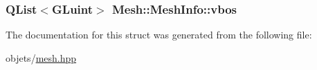 \hypertarget{struct_mesh_1_1_mesh_info_ad360b326ff7424dc9b6a3f6614af895d}{
\subsubsection[{vbos}]{\setlength{\rightskip}{0pt plus 5cm}Q\+List$<$G\+Luint$>$ Mesh\+::\+Mesh\+Info\+::vbos}}\label{struct_mesh_1_1_mesh_info_ad360b326ff7424dc9b6a3f6614af895d}


The documentation for this struct was generated from the following file\+:\begin{DoxyCompactItemize}
\item 
objets/\hyperlink{mesh_8hpp}{mesh.\+hpp}\end{DoxyCompactItemize}
